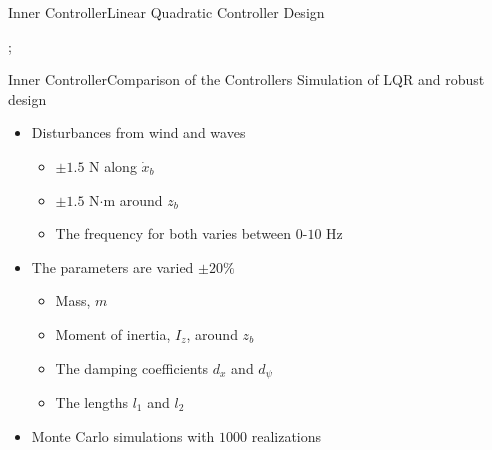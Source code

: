 \begin{frame}{Inner Controller}{Linear Quadratic Controller Design}
{{{\begin{minipage}{0.01\linewidth}
  \end{minipage}
  };}
}
\end{frame}



\begin{frame}{Inner Controller}{Comparison of the Controllers}
  Simulation of LQR and robust design
  \begin{itemize}
    \item<1-> Disturbances from wind and waves
    \begin{itemize}
      \item<1-> $\pm 1.5$ N along $\dot{x}_b$
      \item<1-> $\pm 1.5$ N$\cdot$m around $z_b$
      \item<1-> The frequency for both varies between $0$-$10$ Hz 
    \end{itemize}
    \item<2-> The parameters are varied $\pm 20\%$
    \begin{itemize}
      \item<2-> Mass, $m$
      \item<2-> Moment of inertia, $I_z$, around $z_b$
      \item<2-> The damping coefficients $d_x$ and $d_\psi$
      \item<2-> The lengths $l_1$ and $l_2$
    \end{itemize}
  \item<3-> Monte Carlo simulations with $1000$ realizations
  \end{itemize}
\end{frame}


